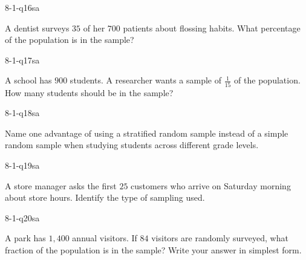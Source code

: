 
\begin{practiceQuestion}{8-1-q16}{sa}
\begin{questionText}
A dentist surveys $35$ of her $700$ patients about flossing habits. What percentage of the population is in the sample?
\end{questionText}
\end{practiceQuestion}

\begin{practiceQuestion}{8-1-q17}{sa}
\begin{questionText}
A school has $900$ students. A researcher wants a sample of $\frac{1}{15}$ of the population. How many students should be in the sample?
\end{questionText}
\end{practiceQuestion}

\begin{practiceQuestion}{8-1-q18}{sa}
\begin{questionText}
Name one advantage of using a stratified random sample instead of a simple random sample when studying students across different grade levels.
\end{questionText}
\end{practiceQuestion}

\begin{practiceQuestion}{8-1-q19}{sa}
\begin{questionText}
A store manager asks the first $25$ customers who arrive on Saturday morning about store hours. Identify the type of sampling used.
\end{questionText}
\end{practiceQuestion}

\begin{practiceQuestion}{8-1-q20}{sa}
\begin{questionText}
A park has $1{,}400$ annual visitors. If $84$ visitors are randomly surveyed, what fraction of the population is in the sample? Write your answer in simplest form.
\end{questionText}
\end{practiceQuestion}

